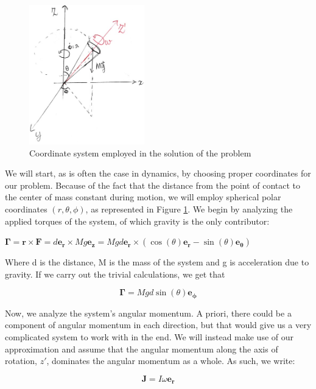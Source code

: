 \documentclass[a4paper,12pt]{article}
\begin{document}
\begin{figure}[h!]
\centering
\label{coord_system}
\caption{Coordinate system employed in the solution of the problem}
\includegraphics[width=5cm]{coord.jpg}
\end{figure} 

We will start, as is often the case in dynamics, by choosing proper coordinates for our problem. Because of the fact that the distance from the point of contact to the center of mass constant during motion, we will employ spherical polar coordinates $(r,\theta,\phi)$, as represented in Figure \ref{coord_system}. We begin by analyzing the applied torques of the system, of which gravity is the only contributor:

$\boldsymbol{\Gamma} = \boldsymbol{r} \times \boldsymbol{F} = d \boldsymbol{e_r} \times M g \boldsymbol{e_z} = M g d \boldsymbol{e_r} \times (\cos(\theta) \boldsymbol{e_r}-\sin(\theta) \boldsymbol{e_\theta})$

Where d is the distance, M is the mass of the system and g is acceleration due to gravity. If we carry out the trivial calculations, we get that 

\begin{equation}
	\label{torque}
	\boldsymbol{\Gamma} = M g d \sin(\theta) \boldsymbol{e_{\phi}}
\end{equation}

Now, we analyze the system's angular momentum. A priori, there could be a component of angular momentum in each direction, but that would give us a very complicated system to work with in the end. We will instead make use of our approximation and assume that the angular momentum along the axis of rotation, $z'$, dominates the angular momentum as a whole. As such, we write:

\begin{equation}
\label{angular}
	\boldsymbol{J} = I \omega \boldsymbol{e_r}
\end{equation}
\end{document}

